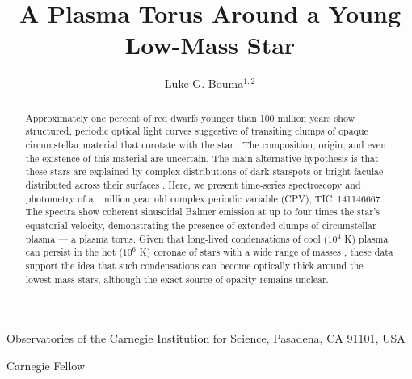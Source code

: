 \documentclass{nature3}
\title{A Plasma Torus Around a Young Low-Mass Star}
\newcommand{\carnegie}{Observatories of the Carnegie Institution for Science, Pasadena, CA 91101, USA}
\begin{document}
\author{Luke G. Bouma$^{1,2}$}

\maketitle

\scriptsize
\begin{affiliations}
\item \carnegie
\item Carnegie Fellow
\end{affiliations}
\normalsize


\begin{abstract}
\normalfont
Approximately one percent of red dwarfs younger than 100 million years
show structured, periodic optical light curves suggestive of
transiting clumps of opaque circumstellar material that corotate
with the star \cite{Rebull2016,Stauffer2017,Rebull2018,Bouma2024}.
The composition, origin, and even the existence of this material are
uncertain. The main alternative hypothesis is that these stars are
explained by complex distributions of dark starspots or bright
faculae distributed across their surfaces \cite{Koen2021}.  Here, we
present time-series spectroscopy and photometry of a \stagemyr\
million year old complex periodic variable (CPV), TIC~141146667. The
spectra show coherent sinusoidal Balmer emission at up to four times
the star's equatorial velocity, demonstrating the presence of
extended clumps of circumstellar plasma --- a plasma torus.  Given
that long-lived condensations of cool ($10^4$ K) plasma can persist
in the hot ($10^6$ K) coronae of stars with a wide range of masses
\cite{CollierCameron1989,Townsend2005,Dunstone2006,Petit2013,Waugh2022,Daley-Yates2024},
these data support the idea that such condensations can become
optically thick around the lowest-mass stars, although the exact
source of opacity remains unclear.
\end{abstract}

\maketitle

\end{document}
